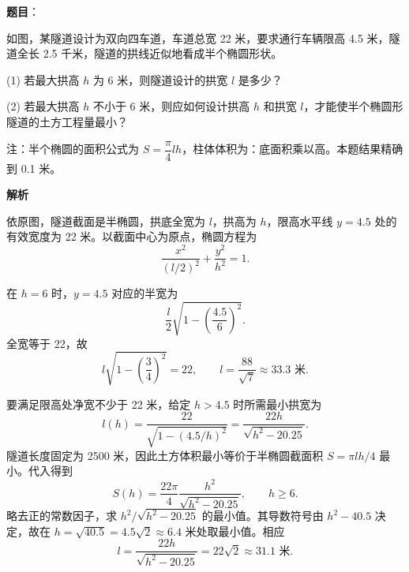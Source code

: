 \begin{answer}

\textbf{题目}：

如图，某隧道设计为双向四车道，车道总宽 22 米，要求通行车辆限高 4.5 米，隧道全长 2.5 千米，隧道的拱线近似地看成半个椭圆形状。

    (1) 若最大拱高 \(h\) 为 6 米，则隧道设计的拱宽 \(l\) 是多少？

    (2) 若最大拱高 \(h\) 不小于 6 米，则应如何设计拱高 \(h\) 和拱宽 \(l\)，才能使半个椭圆形隧道的土方工程量最小？

    注：半个椭圆的面积公式为 \(S=\dfrac{\pi}{4}lh\)，柱体体积为：底面积乘以高。本题结果精确到 0.1 米。
\nopagebreak[4]
\begin{center}\end{center}
\nopagebreak[4]
\textbf{解析}

依原图，隧道截面是半椭圆，拱底全宽为 \(l\)，拱高为 \(h\)，限高水平线 \(y=4.5\) 处的有效宽度为 22 米。以截面中心为原点，椭圆方程为
\nopagebreak[4]
\[
\frac{x^2}{(l/2)^2}+\frac{y^2}{h^2}=1.
\]


在 \(h=6\) 时，\(y=4.5\) 对应的半宽为
\nopagebreak[4]
\[
\frac l2\sqrt{1-\left(\frac{4.5}{6}\right)^2}.
\]
全宽等于 22，故
\nopagebreak[4]
\[
l\sqrt{1-\left(\frac34\right)^2}=22,
\qquad l=\frac{88}{\sqrt7}\approx33.3\text{ 米}.
\]


要满足限高处净宽不少于 22 米，给定 \(h>4.5\) 时所需最小拱宽为
\nopagebreak[4]
\[
l(h)=\frac{22}{\sqrt{1-(4.5/h)^2}}
=\frac{22h}{\sqrt{h^2-20.25}}.
\]
隧道长度固定为 2500 米，因此土方体积最小等价于半椭圆截面积 \(S=\pi lh/4\) 最小。代入得到
\nopagebreak[4]
\[
S(h)=\frac{22\pi}{4}\frac{h^2}{\sqrt{h^2-20.25}},\qquad h\ge6.
\]
略去正的常数因子，求 \(h^2/\sqrt{h^2-20.25}\) 的最小值。其导数符号由 \(h^2-40.5\) 决定，故在 \(h=\sqrt{40.5}=4.5\sqrt2\approx6.4\) 米处取最小值。相应
\nopagebreak[4]
\[
l=\frac{22h}{\sqrt{h^2-20.25}}=22\sqrt2\approx31.1\text{ 米}.
\]



\end{answer}
